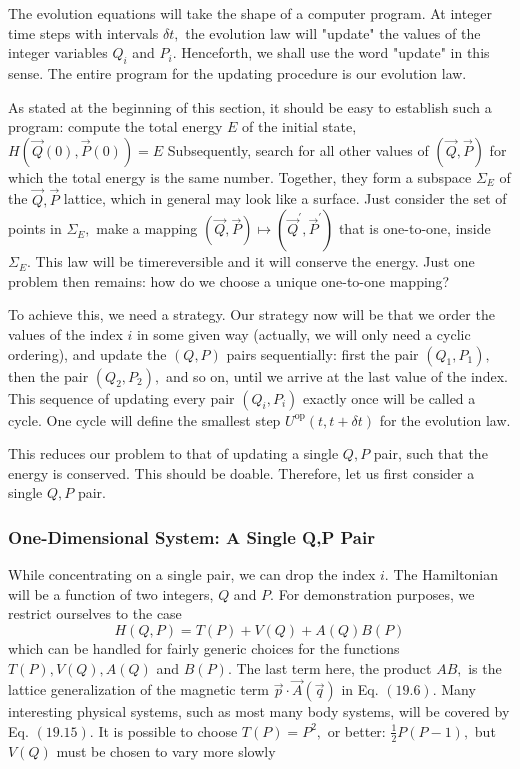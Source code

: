 \documentclass[main.tex]{subfiles}
\begin{document}
The evolution equations will take the shape of a computer program. At integer time steps with intervals $\delta t,$ the evolution law will "update" the values of the integer variables $Q_{i}$ and $P_{i} .$ Henceforth, we shall use the word "update" in this sense. The entire program for the updating procedure is our evolution law.

As stated at the beginning of this section, it should be easy to establish such a program: compute the total energy $E$ of the initial state, $H(\vec{Q}(0), \vec{P}(0))=E$ Subsequently, search for all other values of $(\vec{Q}, \vec{P})$ for which the total energy is the same number. Together, they form a subspace $\Sigma_{E}$ of the $\vec{Q}, \vec{P}$ lattice, which in general may look like a surface. Just consider the set of points in $\Sigma_{E},$ make a mapping $(\vec{Q}, \vec{P}) \mapsto\left(\vec{Q}^{\prime}, \vec{P}^{\prime}\right)$ that is one-to-one, inside $\Sigma_{E} .$ This law will be timereversible and it will conserve the energy. Just one problem then remains: how do we choose a unique one-to-one mapping?

To achieve this, we need a strategy. Our strategy now will be that we order the values of the index $i$ in some given way (actually, we will only need a cyclic ordering), and update the $(Q, P)$ pairs sequentially: first the pair $\left(Q_{1}, P_{1}\right),$ then the pair $\left(Q_{2}, P_{2}\right),$ and so on, until we arrive at the last value of the index. This sequence of updating every pair $\left(Q_{i}, P_{i}\right)$ exactly once will be called a cycle. One cycle will define the smallest step $U^{\mathrm{op}}(t, t+\delta t)$ for the evolution law.

This reduces our problem to that of updating a single $Q, P$ pair, such that the energy is conserved. This should be doable. Therefore, let us first consider a single $Q, P$ pair.




\subsubsection{One-Dimensional System: A Single Q,P Pair}\label{ch19.4.1}

While concentrating on a single pair, we can drop the index $i .$ The Hamiltonian will be a function of two integers, $Q$ and $P .$ For demonstration purposes, we restrict ourselves to the case
$$
H(Q, P)=T(P)+V(Q)+A(Q) B(P)
$$
which can be handled for fairly generic choices for the functions $T(P), V(Q), A(Q)$ and $B(P) .$ The last term here, the product $A B,$ is the lattice generalization of the magnetic term $\vec{p} \cdot \vec{A}(\vec{q})$ in Eq. $(19.6) .$ Many interesting physical systems, such as most many body systems, will be covered by Eq. $(19.15) .$ It is possible to choose $T(P)=P^{2},$ or better: $\frac{1}{2} P(P-1),$ but $V(Q)$ must be chosen to vary more slowly
\end{document}
